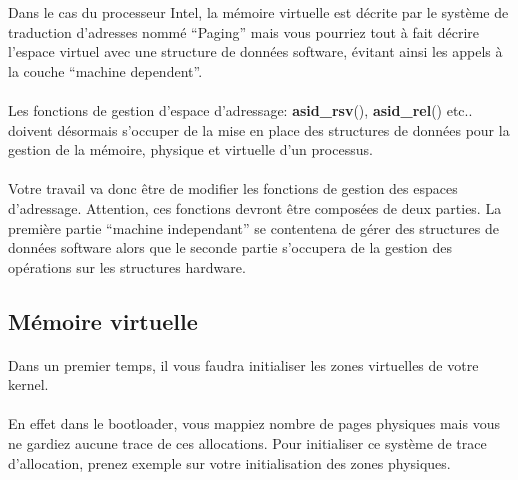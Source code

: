 \documentclass[10pt,a4wide]{article}
\begin{document}
Dans le cas du processeur Intel, la m\'emoire virtuelle est d\'ecrite
par le syst\`eme de traduction d'adresses nomm\'e ``Paging'' mais
vous pourriez tout \`a fait d\'ecrire l'espace virtuel avec une structure
de donn\'ees software, \'evitant ainsi les appels \`a la couche ``machine
dependent''.

\paragraph{}

Les fonctions de gestion d'espace d'adressage: \textbf{asid\_rsv}(),
\textbf{asid\_rel}() etc.. doivent d\'esormais s'occuper de la mise en
place des structures de donn\'ees pour la gestion de la m\'emoire, physique
et virtuelle d'un processus.

\paragraph{}

Votre travail va donc \^etre de modifier les fonctions de gestion des
espaces d'adressage. Attention, ces fonctions devront \^etre compos\'ees
de deux parties. La premi\`ere partie ``machine independant'' se contentena
de g\'erer des structures de donn\'ees software alors que le seconde partie
s'occupera de la gestion des op\'erations sur les structures hardware.

\subsection{M\'emoire virtuelle}

\paragraph{}

Dans un premier temps, il vous faudra initialiser les zones virtuelles
de votre kernel.

\paragraph{}

En effet dans le bootloader, vous mappiez nombre de pages physiques
mais vous ne gardiez aucune trace de ces allocations. Pour initialiser
ce syst\`eme de trace d'allocation, prenez exemple sur votre
initialisation des zones physiques.

\paragraph{}
\end{document}
